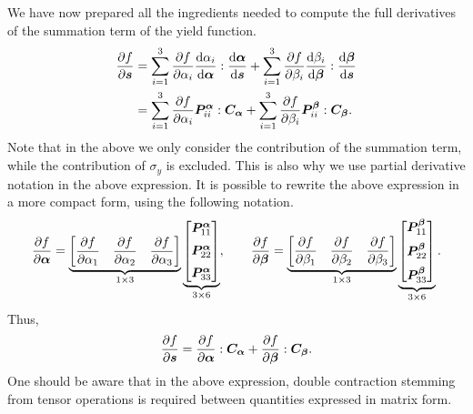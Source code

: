 We have now prepared all the ingredients needed to compute the full derivatives of the summation term of the yield function.
\begin{gather}
    \begin{split}
        \dfrac{\partial{f}}{\partial{\bm{s}}} & =\sum_{i=1}^{3}\dfrac{\partial{f}}{\partial{\alpha_i}}\dfrac{\mathrm{d}\alpha_i}{\mathrm{d}\bm{\alpha}}:\dfrac{\mathrm{d}\bm{\alpha}}{\mathrm{d}\bm{s}}+\sum_{i=1}^{3}\dfrac{\partial{f}}{\partial{\beta_i}}\dfrac{\mathrm{d}\beta_i}{\mathrm{d}\bm{\beta}}:\dfrac{\mathrm{d}\bm{\beta}}{\mathrm{d}\bm{s}} \\
                        & =\sum_{i=1}^{3}\dfrac{\partial{f}}{\partial{\alpha_i}}\bm{P}_{ii}^{\bm{\alpha}}:\bm{C}_{\bm{\alpha}}+\sum_{i=1}^{3}\dfrac{\partial{f}}{\partial{\beta_i}}\bm{P}_{ii}^{\bm{\beta}}:\bm{C}_{\bm{\beta}}.
    \end{split}
\end{gather}
Note that in the above we only consider the contribution of the summation term, while the contribution of $\sigma_y$ is excluded.
This is also why we use partial derivative notation in the above expression.
It is possible to rewrite the above expression in a more compact form, using the following notation.
\begin{gather}
    \dfrac{\partial{f}}{\partial{\bm{\alpha}}}=\underbrace{\begin{bmatrix}
            \dfrac{\partial{f}}{\partial{\alpha_1}} & \dfrac{\partial{f}}{\partial{\alpha_2}} & \dfrac{\partial{f}}{\partial{\alpha_3}}
        \end{bmatrix}}_{1\times3}\underbrace{\begin{bmatrix}
            \bm{P}_{11}^{\bm{\alpha}} \\[2mm]\bm{P}_{22}^{\bm{\alpha}}\\[2mm]\bm{P}_{33}^{\bm{\alpha}}
        \end{bmatrix}}_{3\times6},\qquad
    \dfrac{\partial{f}}{\partial{\bm{\beta}}}=\underbrace{\begin{bmatrix}
            \dfrac{\partial{f}}{\partial{\beta_1}} & \dfrac{\partial{f}}{\partial{\beta_2}} & \dfrac{\partial{f}}{\partial{\beta_3}}
        \end{bmatrix}}_{1\times3}\underbrace{\begin{bmatrix}
            \bm{P}_{11}^{\bm{\beta}} \\[2mm]\bm{P}_{22}^{\bm{\beta}}\\[2mm]\bm{P}_{33}^{\bm{\beta}}
        \end{bmatrix}}_{3\times6}.
\end{gather}
Thus,
\begin{gather}
    \dfrac{\partial{f}}{\partial{\bm{s}}}=\dfrac{\partial{f}}{\partial{\bm{\alpha}}}:\bm{C}_{\bm{\alpha}}+\dfrac{\partial{f}}{\partial{\bm{\beta}}}:\bm{C}_{\bm{\beta}}.
\end{gather}
One should be aware that in the above expression, double contraction stemming from tensor operations is required between quantities expressed in matrix form.
